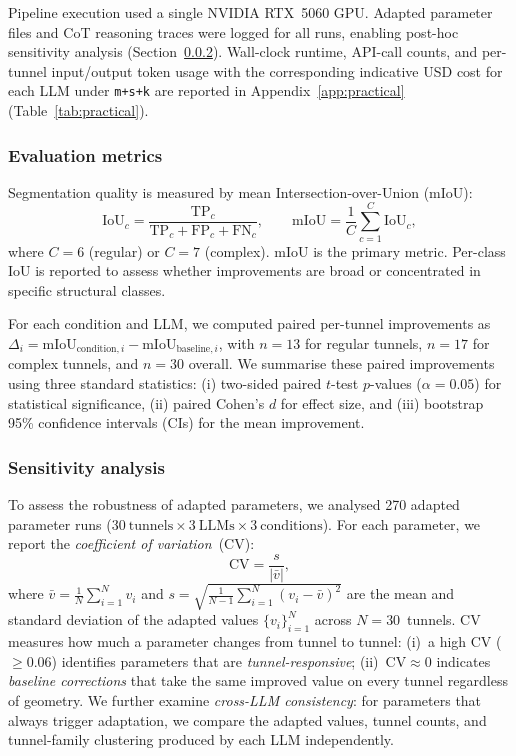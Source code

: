 \documentclass[a4paper,fleqn]{cas-dc}
\begin{document}
Pipeline execution used a single NVIDIA RTX~5060 GPU. Adapted parameter files and CoT reasoning traces were logged for all runs, enabling post-hoc sensitivity analysis (Section~\ref{sec:sensitivity-method}). Wall-clock runtime, API-call counts, and per-tunnel input/output token usage with the corresponding indicative USD cost for each LLM under \texttt{m+s+k} are reported in Appendix~\ref{app:practical} (Table~\ref{tab:practical}).

\subsubsection{Evaluation metrics}\label{sec:metrics}

Segmentation quality is measured by mean Intersection-over-Union (mIoU):
\begin{equation}
\text{IoU}_c = \frac{\text{TP}_c}{\text{TP}_c + \text{FP}_c + \text{FN}_c}, \qquad
\text{mIoU} = \frac{1}{C} \sum_{c=1}^{C} \text{IoU}_c,
\end{equation}
where $C = 6$ (regular) or $C = 7$ (complex). mIoU is the primary metric. Per-class IoU is reported to assess whether improvements are broad or concentrated in specific structural classes.

For each condition and LLM, we computed paired per-tunnel improvements as $\Delta_i = \mathrm{mIoU}_{\text{condition},i} - \mathrm{mIoU}_{\text{baseline},i}$, with $n=13$ for regular tunnels, $n=17$ for complex tunnels, and $n=30$ overall. We summarise these paired improvements using three standard statistics: (i) two-sided paired $t$-test $p$-values ($\alpha = 0.05$) for statistical significance, (ii) paired Cohen's $d$ for effect size, and (iii) bootstrap 95\% confidence intervals (CIs) for the mean improvement.

\subsubsection{Sensitivity analysis}\label{sec:sensitivity-method}

To assess the robustness of adapted parameters, we analysed 270 adapted parameter runs ($30~\text{tunnels} \times 3~\text{LLMs} \times 3~\text{conditions} $). For each parameter, we report the \emph{coefficient of variation}~(CV):
\begin{equation}\label{eq:cv}
\text{CV} = \frac{s}{\lvert\bar{v}\rvert},
\end{equation}
where $\bar{v} = \frac{1}{N}\sum_{i=1}^{N} v_i$ and $s = \sqrt{\frac{1}{N-1}\sum_{i=1}^{N}(v_i - \bar{v})^2}$ are the mean and standard deviation of the adapted values $\{v_i\}_{i=1}^{N}$ across $N = 30$~tunnels. CV measures how much a parameter changes from tunnel to tunnel: (i)~a high CV ($\geq 0.06$) identifies parameters that are \emph{tunnel-responsive}; (ii)~$\text{CV} \approx 0$ indicates \emph{baseline corrections} that take the same improved value on every tunnel regardless of geometry. We further examine \emph{cross-LLM consistency}: for parameters that always trigger adaptation, we compare the adapted values, tunnel counts, and tunnel-family clustering produced by each LLM independently.
\end{document}

